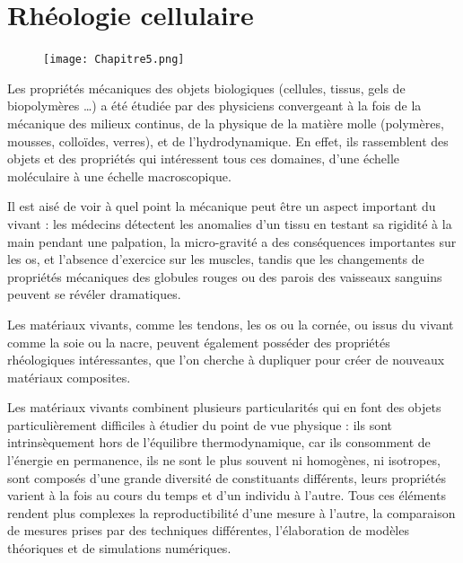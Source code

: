 %
%
%

\chapter{Rhéologie cellulaire}
\begin{figure}

\texttt{[image: Chapitre5.png]}


\end{figure}

\newpage

Les propriétés mécaniques des objets biologiques (cellules, tissus, gels de biopolymères \dots) a été étudiée par des physiciens convergeant à la fois de la mécanique des milieux continus, de la physique de la matière molle (polymères, mousses, colloïdes, verres), et de l'hydrodynamique. 
En effet, ils rassemblent des objets et des propriétés qui intéressent tous ces domaines, d'une échelle moléculaire à une échelle macroscopique. 

Il est aisé de voir à quel point la mécanique peut être un aspect important du vivant : les médecins détectent les anomalies d'un tissu en testant sa rigidité \og à la main \fg pendant une palpation, la micro-gravité a des conséquences importantes sur les os, et l'absence d'exercice sur les muscles, tandis que les changements de propriétés mécaniques des globules rouges ou des parois des vaisseaux sanguins peuvent se révéler dramatiques. 

Les matériaux vivants, comme les tendons, les os ou la cornée, ou issus du vivant comme la soie ou la nacre, peuvent également posséder des propriétés rhéologiques intéressantes, que l'on cherche à dupliquer pour créer de nouveaux matériaux composites. 

Les matériaux vivants combinent plusieurs particularités qui en font des objets particulièrement difficiles à étudier du point de vue physique : ils sont intrinsèquement hors de l'équilibre thermodynamique, car ils consomment de l'énergie en permanence, ils ne sont le plus souvent ni homogènes, ni isotropes, sont composés d'une grande diversité de constituants différents, leurs propriétés varient à la fois au cours du temps et d'un individu à l'autre. 
Tous ces éléments rendent plus complexes la reproductibilité d'une mesure à l'autre, la comparaison de mesures prises par des techniques différentes, l'élaboration de modèles théoriques et de simulations numériques.


